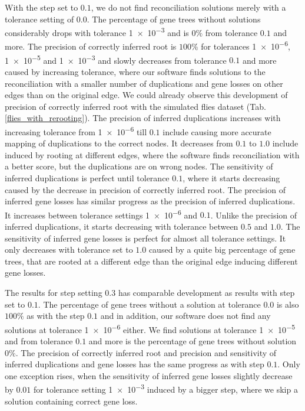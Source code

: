 With the step set to $0.1$, we do not find reconciliation solutions merely with a tolerance setting of $0.0$. The percentage of gene trees without solutions considerably drops with tolerance \num{1e-3} and is $0\%$ from tolerance $0.1$ and more. The precision of correctly inferred root is $100\%$ for tolerances \num{1e-6}, \num{1e-5} and \num{1e-3} and slowly decreases from tolerance $0.1$ and more caused by increasing tolerance, where our software finds solutions to the reconciliation with a smaller number of duplications and gene losses on other edges than on the original edge. We could already observe this development of precision of correctly inferred root with the simulated flies dataset (Tab. \ref{flies_with_rerooting}). The precision of inferred duplications increases with increasing tolerance from \num{1e-6} till $0.1$ include causing more accurate mapping of duplications to the correct nodes. It decreases from $0.1$ to $1.0$ include induced by rooting at different edges, where the software finds reconciliation with a better score, but the duplications are on wrong nodes. The sensitivity of inferred duplications is perfect until tolerance $0.1$, where it starts decreasing caused by the decrease in precision of correctly inferred root. The precision of inferred gene losses has similar progress as the precision of inferred duplications. It increases between tolerance settings \num{1e-6} and $0.1$. Unlike the precision of inferred duplications, it starts decreasing with tolerance between $0.5$ and $1.0$. The sensitivity of inferred gene losses is perfect for almost all tolerance settings. It only decreases with tolerance set to $1.0$ caused by a quite big percentage of gene trees, that are rooted at a different edge than the original edge inducing different gene losses.

The results for step setting $0.3$ has comparable development as results with step set to $0.1$. The percentage of gene trees without a solution at tolerance $0.0$ is also $100\%$ as with the step $0.1$ and in addition, our software does not find any solutions at tolerance \num{1e-6} either. We find solutions at tolerance \num{1e-5} and from tolerance $0.1$ and more is the percentage of gene trees without solution $0\%$. The precision of correctly inferred root and precision and sensitivity of inferred duplications and gene losses has the same progress as with step $0.1$. Only one exception rises, when the sensitivity of inferred gene losses slightly decrease by $0.01$ for tolerance setting \num{1e-3} induced by a bigger step, where we skip a solution containing correct gene loss.

